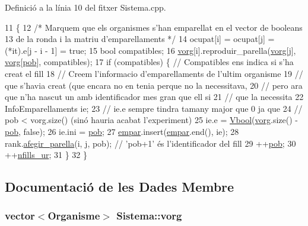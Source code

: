 Definició a la línia 10 del fitxer Sistema.\-cpp.


\begin{DoxyCode}
11                                                      \{
12     \textcolor{comment}{/* Marquem que els organismes s'han emparellat en el vector de booleans
}
13 \textcolor{comment}{       de la ronda i la matriu d'emparellaments */}
14     ocupat[i] = ocupat[j] = (*it).e[j - i - 1] = \textcolor{keyword}{true};
15     \textcolor{keywordtype}{bool} compatibles;
16     \hyperlink{class_sistema_aaf10c33a8449e355103fb2d849bb3d58}{vorg}[i].reproduir\_parella(\hyperlink{class_sistema_aaf10c33a8449e355103fb2d849bb3d58}{vorg}[j], \hyperlink{class_sistema_aaf10c33a8449e355103fb2d849bb3d58}{vorg}[\hyperlink{class_sistema_a5fe670604926861f960dfb33c80d45cf}{pob}], compatibles);
17     \textcolor{keywordflow}{if} (compatibles) \{ \textcolor{comment}{// Compatibles ens indica si s'ha creat el fill}
18         \textcolor{comment}{// Creem l'informacio d'emparellaments de l'ultim organisme}
19         \textcolor{comment}{// que s'havia creat (que encara no en tenia perque no la necessitava,}
20         \textcolor{comment}{// pero ara que n'ha nascut un amb identificador mes gran que ell si}
21         \textcolor{comment}{// que la necessita}
22         InfoEmparellaments ie;
23         \textcolor{comment}{// ie.e sempre tindra tamany major que 0 ja que}
24         \textcolor{comment}{// pob < vorg.size() (sinó hauria acabat l'experiment)}
25         ie.e = \hyperlink{class_sistema_aed93022dab0bed25a0b6439559ea1b8b}{Vbool}(\hyperlink{class_sistema_aaf10c33a8449e355103fb2d849bb3d58}{vorg}.size() - \hyperlink{class_sistema_a5fe670604926861f960dfb33c80d45cf}{pob}, \textcolor{keyword}{false});
26         ie.ini = \hyperlink{class_sistema_a5fe670604926861f960dfb33c80d45cf}{pob};
27         \hyperlink{class_sistema_a98845ff9b4955ce24f2378d90ca135aa}{empar}.insert(\hyperlink{class_sistema_a98845ff9b4955ce24f2378d90ca135aa}{empar}.end(), ie);
28         rank.\hyperlink{class_ranking_a10b14da6a47f06eccff565a2d490b5fe}{afegir\_parella}(i, j, pob); \textcolor{comment}{// 'pob+1' és l'identificador del fill}
29         ++\hyperlink{class_sistema_a5fe670604926861f960dfb33c80d45cf}{pob};
30         ++\hyperlink{class_sistema_aebdda1654fd616f76f03691926ecfb09}{nfills\_ur};
31     \}
32 \}
\end{DoxyCode}


\subsection{Documentació de les Dades Membre}
\hypertarget{class_sistema_aaf10c33a8449e355103fb2d849bb3d58}{
\subsubsection[{vorg}]{\setlength{\rightskip}{0pt plus 5cm}vector$<${\bf Organisme}$>$ Sistema\-::vorg\hspace{0.3cm}{\ttfamily [private]}}}\label{class_sistema_aaf10c33a8449e355103fb2d849bb3d58}


